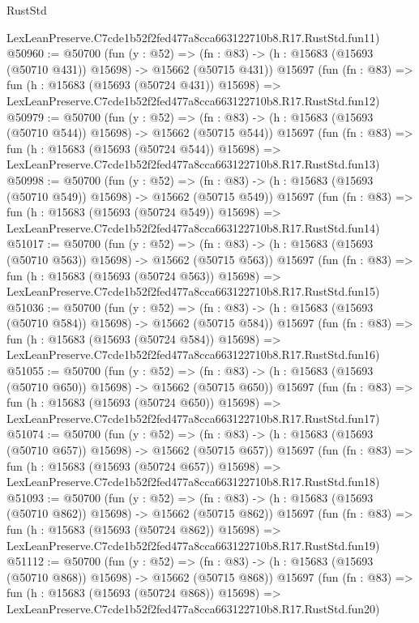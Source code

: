 \begin{lexlean}{RustStd}
\begin{coremodule}
    LexLeanPreserve.C7cde1b52f2fed477a8cca663122710b8.R17.RustStd.fun11)
@50960 := @50700
    (fun (y : @52) =>
    (fn : @83) -> (h : @15683 (@15693 (@50710 @431)) @15698) -> @15662 (@50715 @431))
    @15697
    (fun (fn : @83) =>
    fun (h : @15683 (@15693 (@50724 @431)) @15698) =>
    LexLeanPreserve.C7cde1b52f2fed477a8cca663122710b8.R17.RustStd.fun12)
@50979 := @50700
    (fun (y : @52) =>
    (fn : @83) -> (h : @15683 (@15693 (@50710 @544)) @15698) -> @15662 (@50715 @544))
    @15697
    (fun (fn : @83) =>
    fun (h : @15683 (@15693 (@50724 @544)) @15698) =>
    LexLeanPreserve.C7cde1b52f2fed477a8cca663122710b8.R17.RustStd.fun13)
@50998 := @50700
    (fun (y : @52) =>
    (fn : @83) -> (h : @15683 (@15693 (@50710 @549)) @15698) -> @15662 (@50715 @549))
    @15697
    (fun (fn : @83) =>
    fun (h : @15683 (@15693 (@50724 @549)) @15698) =>
    LexLeanPreserve.C7cde1b52f2fed477a8cca663122710b8.R17.RustStd.fun14)
@51017 := @50700
    (fun (y : @52) =>
    (fn : @83) -> (h : @15683 (@15693 (@50710 @563)) @15698) -> @15662 (@50715 @563))
    @15697
    (fun (fn : @83) =>
    fun (h : @15683 (@15693 (@50724 @563)) @15698) =>
    LexLeanPreserve.C7cde1b52f2fed477a8cca663122710b8.R17.RustStd.fun15)
@51036 := @50700
    (fun (y : @52) =>
    (fn : @83) -> (h : @15683 (@15693 (@50710 @584)) @15698) -> @15662 (@50715 @584))
    @15697
    (fun (fn : @83) =>
    fun (h : @15683 (@15693 (@50724 @584)) @15698) =>
    LexLeanPreserve.C7cde1b52f2fed477a8cca663122710b8.R17.RustStd.fun16)
@51055 := @50700
    (fun (y : @52) =>
    (fn : @83) -> (h : @15683 (@15693 (@50710 @650)) @15698) -> @15662 (@50715 @650))
    @15697
    (fun (fn : @83) =>
    fun (h : @15683 (@15693 (@50724 @650)) @15698) =>
    LexLeanPreserve.C7cde1b52f2fed477a8cca663122710b8.R17.RustStd.fun17)
@51074 := @50700
    (fun (y : @52) =>
    (fn : @83) -> (h : @15683 (@15693 (@50710 @657)) @15698) -> @15662 (@50715 @657))
    @15697
    (fun (fn : @83) =>
    fun (h : @15683 (@15693 (@50724 @657)) @15698) =>
    LexLeanPreserve.C7cde1b52f2fed477a8cca663122710b8.R17.RustStd.fun18)
@51093 := @50700
    (fun (y : @52) =>
    (fn : @83) -> (h : @15683 (@15693 (@50710 @862)) @15698) -> @15662 (@50715 @862))
    @15697
    (fun (fn : @83) =>
    fun (h : @15683 (@15693 (@50724 @862)) @15698) =>
    LexLeanPreserve.C7cde1b52f2fed477a8cca663122710b8.R17.RustStd.fun19)
@51112 := @50700
    (fun (y : @52) =>
    (fn : @83) -> (h : @15683 (@15693 (@50710 @868)) @15698) -> @15662 (@50715 @868))
    @15697
    (fun (fn : @83) =>
    fun (h : @15683 (@15693 (@50724 @868)) @15698) =>
    LexLeanPreserve.C7cde1b52f2fed477a8cca663122710b8.R17.RustStd.fun20)

\end{coremodule}
\end{lexlean}
